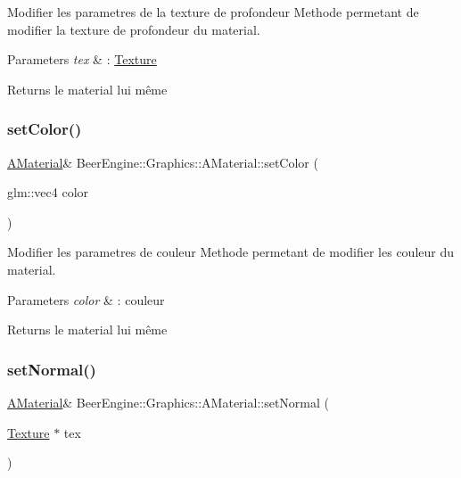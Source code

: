 Modifier les parametres de la texture de profondeur Methode permetant de modifier la texture de profondeur du material. 


\begin{DoxyParams}{Parameters}
{\em tex} & \+: \mbox{\hyperlink{class_beer_engine_1_1_graphics_1_1_texture}{Texture}} \\
\hline
\end{DoxyParams}
\begin{DoxyReturn}{Returns}
le material lui même 
\end{DoxyReturn}
\mbox{\label{class_beer_engine_1_1_graphics_1_1_a_material_aee06176499221fa6f100299bbd9bf24a}} 
\subsubsection{\texorpdfstring{set\+Color()}{setColor()}}
{\footnotesize\ttfamily \mbox{\hyperlink{class_beer_engine_1_1_graphics_1_1_a_material}{A\+Material}}\& Beer\+Engine\+::\+Graphics\+::\+A\+Material\+::set\+Color (\begin{DoxyParamCaption}\item[{glm\+::vec4}]{color }\end{DoxyParamCaption})}



Modifier les parametres de couleur Methode permetant de modifier les couleur du material. 


\begin{DoxyParams}{Parameters}
{\em color} & \+: couleur \\
\hline
\end{DoxyParams}
\begin{DoxyReturn}{Returns}
le material lui même 
\end{DoxyReturn}
\mbox{\label{class_beer_engine_1_1_graphics_1_1_a_material_aa7e96809befbf9fe3098f49aeef0d25a}} 
\subsubsection{\texorpdfstring{set\+Normal()}{setNormal()}}
{\footnotesize\ttfamily \mbox{\hyperlink{class_beer_engine_1_1_graphics_1_1_a_material}{A\+Material}}\& Beer\+Engine\+::\+Graphics\+::\+A\+Material\+::set\+Normal (\begin{DoxyParamCaption}\item[{\mbox{\hyperlink{class_beer_engine_1_1_graphics_1_1_texture}{Texture}} $\ast$}]{tex }\end{DoxyParamCaption})}



